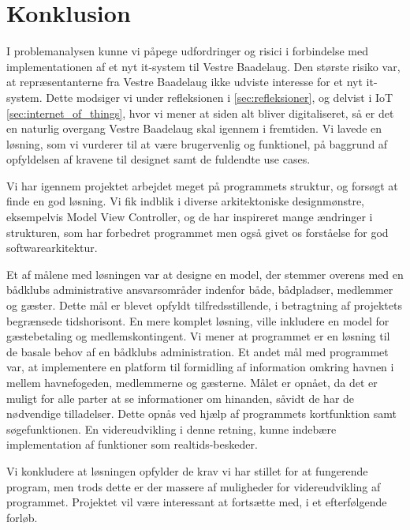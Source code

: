 \chapter{Konklusion}
\label{cha:konklusion}

I problemanalysen kunne vi påpege udfordringer og risici i forbindelse med implementationen af et nyt it-system til Vestre Baadelaug. Den største risiko var, at repræsentanterne fra Vestre Baadelaug ikke udviste interesse for et nyt it-system. Dette modsiger vi under refleksionen i \cref{sec:refleksioner}, og delvist i IoT \cref{sec:internet_of_things}, hvor vi mener at siden alt bliver digitaliseret, så er det en naturlig overgang Vestre Baadelaug skal igennem i fremtiden. Vi lavede en løsning, som vi vurderer til at være brugervenlig og funktionel, på baggrund af opfyldelsen af kravene til designet samt de fuldendte use cases.

Vi har igennem projektet arbejdet meget på programmets struktur, og forsøgt at finde en god løsning. Vi fik indblik i diverse arkitektoniske designmønstre, eksempelvis Model View Controller, og de har inspireret mange ændringer i strukturen, som har forbedret programmet men også givet os forståelse for god softwarearkitektur.

Et af målene med løsningen var at designe en model, der stemmer overens med en bådklubs administrative ansvarsområder indenfor både, bådpladser, medlemmer og gæster. Dette mål er blevet opfyldt tilfredsstillende, i betragtning af projektets begrænsede tidshorisont. En mere komplet løsning, ville inkludere en model for gæstebetaling og medlemskontingent. Vi mener at programmet er en løsning til de basale behov af en bådklubs administration. Et andet mål med programmet var, at implementere en platform til formidling af information omkring havnen i mellem havnefogeden, medlemmerne og gæsterne. Målet er opnået, da det er muligt for alle parter at se informationer om hinanden, såvidt de har de nødvendige tilladelser. Dette opnås ved hjælp af programmets kortfunktion samt søgefunktionen. En videreudvikling i denne retning, kunne indebære implementation af funktioner som realtids-beskeder.

Vi konkludere at løsningen opfylder de krav vi har stillet for at fungerende program, men trods dette er der massere af muligheder for videreudvikling af programmet. Projektet vil være interessant at fortsætte med, i et efterfølgende forløb. 